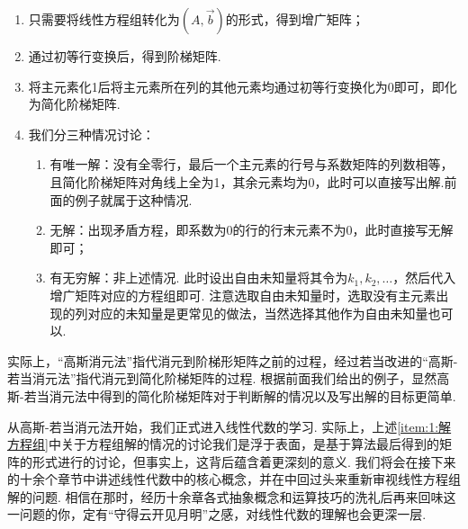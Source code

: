 \begin{enumerate}[label=步骤\arabic*~]
    \item 只需要将线性方程组转化为$(A, \vec{b})$的形式，得到增广矩阵；

    \item 通过初等行变换后，得到阶梯矩阵.

    \item 将主元素化1后将主元素所在列的其他元素均通过初等行变换化为0即可，即化为简化阶梯矩阵.

    \item \label{item:1:解方程组}
          我们分三种情况讨论：
          \begin{enumerate}
              \item 有唯一解：没有全零行，最后一个主元素的行号与系数矩阵的列数相等，且简化阶梯矩阵对角线上全为1，其余元素均为0，此时可以直接写出解.前面的例子就属于这种情况.

              \item 无解：出现矛盾方程，即系数为0的行的行末元素不为0，此时直接写无解即可；

              \item 有无穷解：非上述情况. 此时设出自由未知量将其令为$k_1,k_2,\ldots$，然后代入增广矩阵对应的方程组即可. 注意选取自由未知量时，选取没有主元素出现的列对应的未知量是更常见的做法，当然选择其他作为自由未知量也可以.
          \end{enumerate}
\end{enumerate}

实际上，``高斯消元法''指代消元到阶梯形矩阵之前的过程，经过若当改进的``高斯-若当消元法''指代消元到简化阶梯矩阵的过程. 根据前面我们给出的例子，显然高斯-若当消元法中得到的简化阶梯矩阵对于判断解的情况以及写出解的目标更简单.

从高斯-若当消元法开始，我们正式进入线性代数的学习. 实际上，上述\ref*{item:1:解方程组}中关于方程组解的情况的讨论我们是浮于表面，是基于算法最后得到的矩阵的形式进行的讨论，但事实上，这背后蕴含着更深刻的意义. 我们将会在接下来的十余个章节中讲述线性代数中的核心概念，并在中回过头来重新审视线性方程组解的问题. 相信在那时，经历十余章各式抽象概念和运算技巧的洗礼后再来回味这一问题的你，定有``守得云开见月明''之感，对线性代数的理解也会更深一层.

